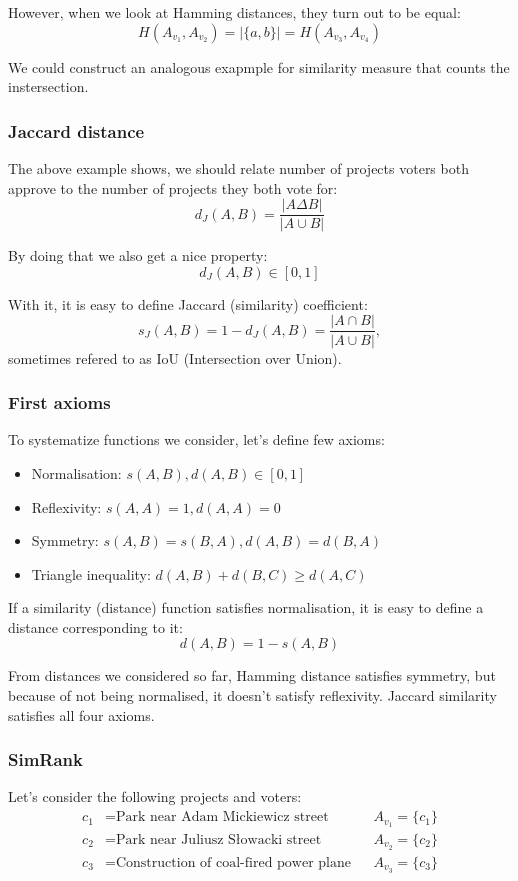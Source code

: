 \documentclass{article}
\begin{document}
However, when we look at Hamming distances, they turn out to be equal:
\[ H(A_{v_1},A_{v_2}) = |\{a,b\}| = H(A_{v_3},A_{v_4}) \]

We could construct an analogous exapmple for similarity measure that counts the
instersection.

\subsubsection{Jaccard distance}

The above example shows, we should relate number of projects voters both
approve to the number of projects they both vote for:
\[ d_J(A,B) = \frac{|A \Delta B|}{|A \cup B|} \]

By doing that we also get a nice property:
\[ d_J(A,B) \in [0, 1] \]

With it, it is easy to define Jaccard (similarity) coefficient:
\[ s_J(A,B) = 1 - d_J(A,B) = \frac{|A \cap B|}{|A \cup B|}, \]
sometimes refered to as IoU (Intersection over Union).

\subsubsection*{First axioms}

To systematize functions we consider, let's define few axioms:

\begin{itemize}
  \item Normalisation: $s(A,B),d(A,B) \in [0, 1]$
  \item Reflexivity: $s(A,A) = 1, d(A,A) = 0$
  \item Symmetry: $s(A,B) = s(B,A), d(A,B) = d(B,A)$
  \item Triangle inequality: $d(A,B) + d(B,C) \geq d(A,C)$
\end{itemize}

If a similarity (distance) function satisfies normalisation, it is easy to
define a distance corresponding to it:
\[ d(A,B) = 1 - s(A,B) \]

From distances we considered so far, Hamming distance satisfies symmetry,
but because of not being normalised, it doesn't satisfy reflexivity. Jaccard
similarity satisfies all four axioms.

\subsubsection{SimRank}

Let's consider the following projects and voters: 
\begin{align*}
  c_1 &= \text{Park near Adam Mickiewicz street} && A_{v_1} = \{c_1\} \\
  c_2 &= \text{Park near Juliusz Słowacki street} && A_{v_2} = \{c_2\} \\
  c_3 &= \text{Construction of coal-fired power plane} && A_{v_3} = \{c_3\}
\end{align*}
\end{document}
